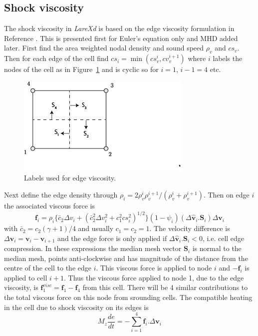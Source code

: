 \documentclass[11pt]{article}
\begin{document}
\subsection{Shock viscosity}
The shock viscosity in {\it LareXd} is based on the edge viscosity formulation in Reference \cite{caramana}.
This is presented first for Euler's equation only and MHD added later.
First find the area weighted nodal density and sound speed $\rho_v$ and $cs_v$. Then for 
each edge of the cell find $cs_i=\min(cs_v^i,cv_v^{i+1})$ where $i$ labels the nodes of the cell
as in Figure~\ref{fig:larexd-grid} and is cyclic so for $i=1$, $i-1=4$ etc. 

\begin{figure}
  \centering
  \includegraphics[scale=0.8]{larexd-grid.png}
  \caption{Labels used for edge viscosity.}
  \label{fig:larexd-grid}
\end{figure} 

Next define the edge
density through $\rho_i=2\rho_v^i \rho_v^{i+1} / (\rho_v^i + \rho_v^{i+1})$. Then on
edge $i$ the associated viscous force is
\begin{equation}
  \mathbf{f}_i=\rho_i\{\bar{c}_2 \Delta v_i + (\bar{c}_2^2 \Delta v_i^2 +c_1^2 cs_i^2)^{1/2}\}
  (1-\psi_i)(\Delta \hat{\mathbf{v}}_i . \mathbf{S}_i)\Delta \mathbf{v}_i
\end{equation}
with $\bar{c}_2=c_2 (\gamma+1)/4$ and usually $c_1=c_2=1$. The velocity difference is
$\Delta \mathbf{v}_i=\mathbf{v}_i - \mathbf{v}_{i+1}$ and the edge force is only applied
if $\Delta \hat{\mathbf{v}}_i . \mathbf{S}_i<0$, i.e. cell edge compression. 
In these expressions the median mesh vector $\mathbf{S}_i$ is normal to the median mesh, points anti-clockwise
and has magnitude of the distance from the centre of the cell to the edge $i$.
This viscous force
is applied to node $i$ and $-\mathbf{f}_i$ is applied to cell $i+1$. Thus the viscous force applied
to node 1, due to the edge viscosity, is $\mathbf{f}_1^{visc}=\mathbf{f}_1-\mathbf{f}_4$ from this cell. 
There will be 4 similar contributions to the total viscous force on this node from srounding cells.
The compatible heating
in the cell due to shock viscosity on its edges is
\begin{equation}
  M_z\frac{de}{dt}=-\sum_{i=1}^4\mathbf{f}_i.\Delta \mathbf{v}_i   
\end{equation} 
\end{document}
